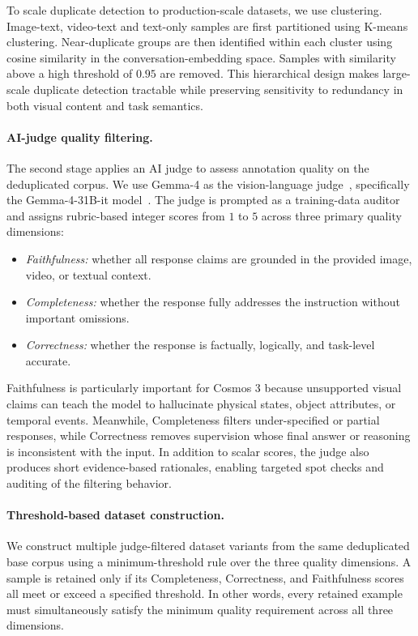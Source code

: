 To scale duplicate detection to production-scale datasets, we use clustering. Image-text, video-text and text-only samples are first partitioned using K-means clustering. Near-duplicate groups are then identified within each cluster using cosine similarity in the conversation-embedding space. Samples with similarity above a high threshold of $0.95$ are removed. This hierarchical design makes large-scale duplicate detection tractable while preserving sensitivity to redundancy in both visual content and task semantics.

\paragraph{AI-judge quality filtering.}
The second stage applies an AI judge to assess annotation quality on the deduplicated corpus. We use Gemma-4 as the vision-language judge~\citep{gemma4modelcard}, specifically the Gemma-4-31B-it model~\citep{gemma4hf31bit}. The judge is prompted as a training-data auditor and assigns rubric-based integer scores from $1$ to $5$ across three primary quality dimensions:

\begin{itemize}
    \item \textit{Faithfulness:} whether all response claims are grounded in the provided image, video, or textual context.
    \item \textit{Completeness:} whether the response fully addresses the instruction without important omissions.
    \item \textit{Correctness:} whether the response is factually, logically, and task-level accurate.
\end{itemize}

Faithfulness is particularly important for Cosmos 3 because unsupported visual claims can teach the model to hallucinate physical states, object attributes, or temporal events. Meanwhile, Completeness filters under-specified or partial responses, while Correctness removes supervision whose final answer or reasoning is inconsistent with the input. In addition to scalar scores, the judge also produces short evidence-based rationales, enabling targeted spot checks and auditing of the filtering behavior.

\paragraph{Threshold-based dataset construction.}
We construct multiple judge-filtered dataset variants from the same deduplicated base corpus using a minimum-threshold rule over the three quality dimensions. A sample is retained only if its Completeness, Correctness, and Faithfulness scores all meet or exceed a specified threshold. In other words, every retained example must simultaneously satisfy the minimum quality requirement across all three dimensions.

